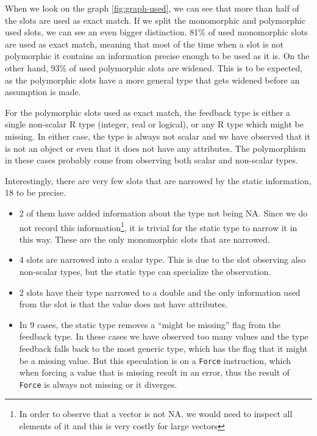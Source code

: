 When we look on the graph \ref{fig:graph-used}, we can see that more than half of the slots are used as exact match. If we split the monomorphic and polymorphic used slots, we can see an even bigger distinction. 81\% of used monomorphic slots are used as exact match, meaning that most of the time when a slot is not polymorphic it contains an information precise enough to be used as it is. On the other hand, 93\% of used polymorphic slots are widened. This is to be expected, as the polymorphic slots have a more general type that gets widened before an assumption is made.

For the polymorphic slots used as exact match, the feedback type is either a single non-scalar R type (integer, real or logical), or any R type which might be missing. In either case, the type is always not scalar and we have observed that it is not an object or even that it does not have any attributes. The polymorphism in these cases probably come from observing both scalar and non-scalar types. 

Interestingly, there are very few slots that are narrowed by the static information, 18 to be precise.

\begin{itemize}
	\item{} 2 of them have added information about the type not being NA. Since we do not record this information\footnote{In order to observe that a vector is not NA, we would need to inspect all elements of it and this is very costly for large vectors}, it is trivial for the static type to narrow it in this way. These are the only monomorphic slots that are narrowed.
	\item{} 4 slots are narrowed into a scalar type. This is due to the slot observing also non-scalar types, but the static type can specialize the observation.
	\item{} 2 slots have their type narrowed to a double and the only information used from the slot is that the value does not have attributes.
	\item{} In 9 cases, the static type removes a \enquote{might be missing} flag from the feedback type. In these cases we have observed too many values and the type feedback falls back to the most generic type, which has the flag that it might be a missing value. But this speculation is on a \texttt{Force} instruction, which when forcing a value that is missing result in an error, thus the result of \texttt{Force} is always not missing or it diverges.
\end{itemize}

